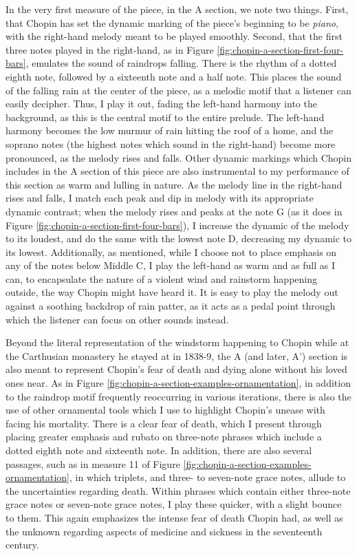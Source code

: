 In the very first measure of the piece, in the A section, we note two things. First, that Chopin has set the dynamic marking of the piece's beginning to be \textit{piano}, with the right-hand melody meant to be played smoothly. Second, that the first three notes played in the right-hand, as in Figure \ref{fig:chopin-a-section-first-four-bars}\autocite{Hansen_1973}, emulates the sound of raindrops falling. There is the rhythm of a dotted eighth note, followed by a sixteenth note and a half note. This places the sound of the falling rain at the center of the piece, as a melodic motif that a listener can easily decipher. Thus, I play it out, fading the left-hand harmony into the background, as this is the central motif to the entire prelude. The left-hand harmony becomes the low murmur of rain hitting the roof of a home, and the soprano notes (the highest notes which sound in the right-hand) become more pronounced, as the melody rises and falls. Other dynamic markings which Chopin includes in the A section of this piece are also instrumental to my performance of this section as warm and lulling in nature. As the melody line in the right-hand rises and falls, I match each peak and dip in melody with its appropriate dynamic contrast; when the melody rises and peaks at the note G (as it does in Figure \ref{fig:chopin-a-section-first-four-bars}\autocite{Hansen_1973}), I increase the dynamic of the melody to its loudest, and do the same with the lowest note D, decreasing my dynamic to its lowest. Additionally, as mentioned, while I choose not to place emphasis on any of the notes below Middle C, I play the left-hand as warm and as full as I can, to encapsulate the nature of a violent wind and rainstorm happening outside, the way Chopin might have heard it. It is easy to play the melody out against a soothing backdrop of rain patter, as it acts as a pedal point through which the listener can focus on other sounds instead.

Beyond the literal representation of the windstorm happening to Chopin while at the Carthusian monastery he stayed at in 1838-9, the A (and later, A') section is also meant to represent Chopin's fear of death and dying alone without his loved ones near. As in Figure \ref{fig:chopin-a-section-examples-ornamentation}\autocite{Hansen_1973}, in addition to the raindrop motif frequently reoccurring in various iterations, there is also the use of other ornamental tools which I use to highlight Chopin's unease with facing his mortality. There is a clear fear of death, which I present through placing greater emphasis and rubato on three-note phrases which include a dotted eighth note and sixteenth note. In addition, there are also several passages, such as in measure 11 of Figure \ref{fig:chopin-a-section-examples-ornamentation}\autocite{Hansen_1973}, in which triplets, and three- to seven-note grace notes, allude to the uncertainties regarding death. Within phrases which contain either three-note grace notes or seven-note grace notes, I play these quicker, with a slight bounce to them. This again emphasizes the intense fear of death Chopin had, as well as the unknown regarding aspects of medicine and sickness in the seventeenth century.


